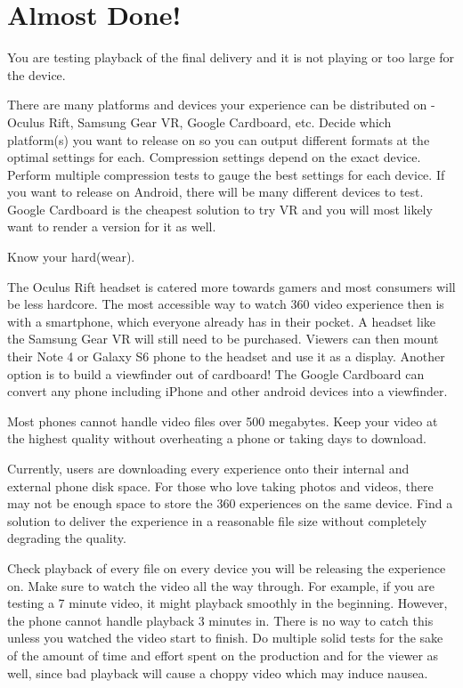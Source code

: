 \chapter{Almost Done!}
\pagecolor{white}
\label{chap:57}
\begin{fullwidth}

\problem

{\large You are testing playback of the final delivery and it is not playing or too large for the device. \par}

There are many platforms and devices your experience can be distributed on - Oculus Rift, Samsung Gear VR, Google Cardboard, etc. Decide which platform(s) you want to release on so you can output different formats at the optimal settings for each. Compression settings depend on the exact device. Perform multiple compression tests to gauge the best settings for each device. If you want to release on Android, there will be many different devices to test. Google Cardboard is the cheapest solution to try VR and you will most likely want to render a version for it as well.

\solutions

{\large Know your hard(wear). \par}

The Oculus Rift headset is catered more towards gamers and most consumers will be less hardcore. The most accessible way to watch 360 video experience then is with a smartphone, which everyone already has in their pocket. A headset like the Samsung Gear VR will still need to be purchased. Viewers can then mount their Note 4 or Galaxy S6 phone to the headset and use it as a display. Another option is to build a viewfinder out of cardboard! The Google Cardboard can convert any phone including iPhone and other android devices into a viewfinder.  
 
Most phones cannot handle video files over 500 megabytes. Keep your video at the highest quality without overheating a phone or taking days to download. 

Currently, users are downloading every experience onto their internal and external phone disk space. For those who love taking photos and videos, there may not be enough space to store the 360 experiences on the same device. Find a solution to deliver the experience in a reasonable file size without completely degrading the quality.

Check playback of every file on every device you will be releasing the experience on. Make sure to watch the video all the way through. For example, if you are testing a 7 minute video, it might playback smoothly in the beginning. However, the phone cannot handle playback 3 minutes in. There is no way to catch this unless you watched the video start to finish. Do multiple solid tests for the sake of the amount of time and effort spent on the production and for the viewer as well, since bad playback will cause a choppy video which may induce nausea. 


\end{fullwidth}
